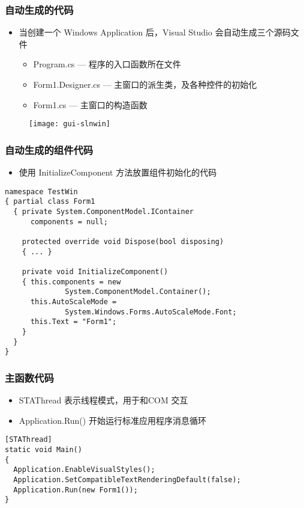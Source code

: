 \begin{frame}
\frametitle{自动生成的代码}
\begin{itemize}
\item 当创建一个 Windows Application 后，Visual Studio 会自动生成三个源码文件
\begin{itemize}
\item Program.cs --- 程序的入口函数所在文件
\item Form1.Designer.cs --- 主窗口的派生类，及各种控件的初始化
\item Form1.cs --- 主窗口的构造函数
\end{itemize}
\end{itemize}
\begin{figure}[htbp]
  \centering
  \texttt{[image: gui-slnwin]}
\end{figure}
\end{frame}

\begin{frame}[fragile]
\frametitle{自动生成的组件代码}
\begin{itemize}
\item 使用 InitializeComponent 方法放置组件初始化的代码
\end{itemize}
\begin{lstlisting}
namespace TestWin
{ partial class Form1
  { private System.ComponentModel.IContainer 
      components = null;

    protected override void Dispose(bool disposing)
    { ... }

    private void InitializeComponent()
    { this.components = new 
              System.ComponentModel.Container();
      this.AutoScaleMode = 
              System.Windows.Forms.AutoScaleMode.Font;
      this.Text = "Form1";
    }
  }
}
\end{lstlisting}
\end{frame}

\begin{frame}[fragile]
\frametitle{主函数代码}
\begin{itemize}
\item STAThread 表示线程模式，用于和COM 交互
\item Application.Run() 开始运行标准应用程序消息循环
\end{itemize}
\begin{lstlisting}
[STAThread]
static void Main()
{
  Application.EnableVisualStyles();
  Application.SetCompatibleTextRenderingDefault(false);
  Application.Run(new Form1());
}
\end{lstlisting}
\end{frame}

